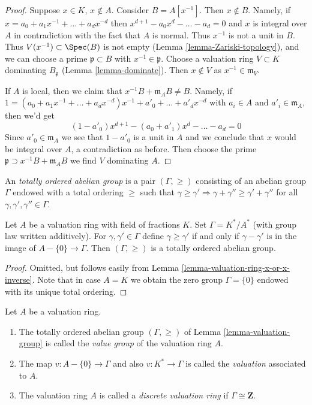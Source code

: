 \begin{proof}
Suppose $x \in K$, $x \not \in A$. Consider $B = A[x^{-1}]$.
Then $x \not \in B$. Namely, if $x = a_0 + a_1x^{-1} + \ldots + a_d x^{-d}$
then $x^{d + 1} - a_0x^d - \ldots - a_d = 0$ and $x$ is integral
over $A$ in contradiction with the fact that $A$ is normal.
Thus $x^{-1}$ is not a unit in $B$. Thus $V(x^{-1}) \subset \Spec(B)$
is not empty (Lemma \ref{lemma-Zariski-topology}), and we can choose a prime
$\mathfrak p \subset B$ with $x^{-1} \in \mathfrak p$.
Choose a valuation ring $V \subset K$ dominating $B_\mathfrak p$
(Lemma \ref{lemma-dominate}).
Then $x \not \in V$ as $x^{-1} \in \mathfrak m_V$.

\medskip\noindent
If $A$ is local, then we claim that $x^{-1} B + \mathfrak m_A B \not = B$.
Namely, if $1 = (a_0 + a_1x^{-1} + \ldots + a_d x^{-d})x^{-1} +
a'_0 + \ldots + a'_d x^{-d}$ with $a_i \in A$ and $a'_i \in \mathfrak m_A$,
then we'd get
$$
(1 - a'_0) x^{d + 1} - (a_0 + a'_1) x^d - \ldots - a_d = 0
$$
Since $a'_0 \in \mathfrak m_A$ we see that $1 - a'_0$ is a unit in $A$
and we conclude that $x$ would be integral over $A$, a contradiction as
before. Then choose the prime $\mathfrak p \supset x^{-1} B + \mathfrak m_A B$
we find $V$ dominating $A$.
\end{proof}

\noindent
An {\it totally ordered abelian group} is a pair $(\Gamma, \geq)$
consisting of an abelian group $\Gamma$ endowed with a total
ordering $\geq$ such that $\gamma \geq \gamma' \Rightarrow
\gamma + \gamma'' \geq \gamma' + \gamma''$ for all
$\gamma, \gamma', \gamma'' \in \Gamma$.

\begin{lemma}
\label{lemma-valuation-group}
Let $A$ be a valuation ring with field of fractions $K$.
Set $\Gamma = K^*/A^*$ (with group law written additively).
For $\gamma, \gamma' \in \Gamma$
define $\gamma \geq \gamma'$ if and only if
$\gamma - \gamma'$ is in the image of $A - \{0\} \to \Gamma$.
Then $(\Gamma, \geq)$ is a totally ordered abelian group.
\end{lemma}

\begin{proof}
Omitted, but follows easily from
Lemma \ref{lemma-valuation-ring-x-or-x-inverse}.
Note that in case $A = K$ we obtain the zero group $\Gamma = \{0\}$
endowed with its unique total ordering.
\end{proof}

\begin{definition}
\label{definition-value-group}
Let $A$ be a valuation ring.
\begin{enumerate}
\item The totally ordered abelian group $(\Gamma, \geq)$ of
Lemma \ref{lemma-valuation-group} is called the
{\it value group} of the valuation ring $A$.
\item The map $v : A - \{0\} \to \Gamma$ and also $v : K^* \to \Gamma$ is
called the {\it valuation} associated to $A$.
\item The valuation ring $A$ is called a {\it discrete valuation ring}
if $\Gamma \cong \mathbf{Z}$.
\end{enumerate}
\end{definition}

